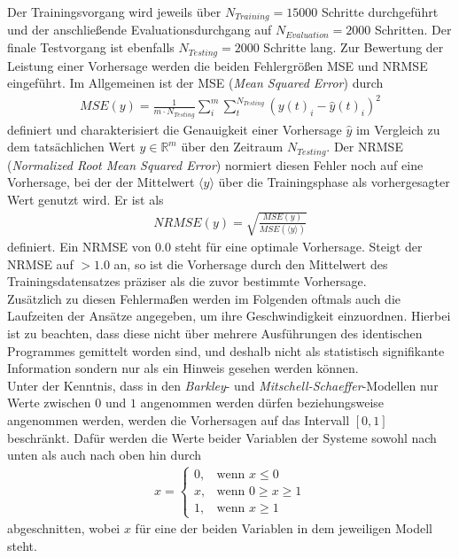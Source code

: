 Der Trainingsvorgang wird jeweils über $N_{Training}=15000$ Schritte durchgeführt und der anschließende Evaluationsdurchgang auf $N_{Evaluation} = 2000$ Schritten. Der finale Testvorgang ist ebenfalls $N_{Testing}=2000$ Schritte lang.
Zur Bewertung der Leistung einer Vorhersage werden die beiden Fehlergrößen MSE und NRMSE eingeführt. Im Allgemeinen ist der MSE (\textit{Mean Squared Error}) durch
\begin{align}
MSE(y) = \frac{1}{m \cdot N_{Testing}} \sum_i^m \sum_t^{N_{Testing}} \left(y(t)_i - \hat{y}(t)_i \right)^2
\end{align}
definiert und charakterisiert die Genauigkeit einer Vorhersage $\hat{y}$ im Vergleich zu dem tatsächlichen Wert $y \in \mathbb{R}^m$ über den Zeitraum $N_{Testing}$. Der NRMSE (\textit{Normalized Root Mean Squared Error}) normiert diesen Fehler noch auf eine Vorhersage, bei der der Mittelwert $\langle y \rangle$ über die Trainingsphase als vorhergesagter Wert genutzt wird. Er ist als
\begin{align}
NRMSE(y) = \sqrt{\frac{MSE(y)}{MSE\left(\langle y \rangle\right)}}
\end{align}
definiert. Ein NRMSE von $0.0$ steht für eine optimale Vorhersage. Steigt der NRMSE auf $>1.0$ an, so ist die Vorhersage durch den Mittelwert des Trainingsdatensatzes präziser als die zuvor bestimmte Vorhersage.\\
Zusätzlich zu diesen Fehlermaßen werden im Folgenden oftmals auch die Laufzeiten der Ansätze angegeben, um ihre Geschwindigkeit einzuordnen. Hierbei ist zu beachten, dass diese nicht über mehrere Ausführungen des identischen Programmes gemittelt worden sind, und deshalb nicht als statistisch signifikante Information sondern nur als ein Hinweis gesehen werden können.\\

Unter der Kenntnis, dass in den \textit{Barkley}- und \textit{Mitschell-Schaeffer}-Modellen nur Werte zwischen $0$ und $1$ angenommen werden dürfen beziehungsweise angenommen werden, werden die Vorhersagen auf das Intervall $[0, 1]$ beschränkt. Dafür werden die Werte beider Variablen der Systeme sowohl nach unten als auch nach oben hin durch 
\begin{align}
x = \begin{cases}
	0,& \text{wenn } x \leq 0\\
	x,& \text{wenn } 0 \geq x \geq1\\
    1,& \text{wenn } x \geq 1
\end{cases}
\end{align}
abgeschnitten, wobei $x$ für eine der beiden Variablen in dem jeweiligen Modell steht.\\

